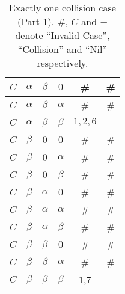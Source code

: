 \documentclass[fleqn]{article}
\begin{document}
\begin {table}
\begin{tabular}{|c|c|c|c|c|c|}
\hline
$C$ & $\alpha$ & $\beta$ & $0$ & \# & \# \\
\hline
$C$ & $\alpha$ & $\beta$ & $\alpha$ & \# & \# \\
\hline
$C$ & $\alpha$ & $\beta$ & $\beta$ & $1, 2, 6$ & - \\
\hline
$C$ & $\beta$ & $0$ & $0$ & \# & \# \\
\hline
$C$ & $\beta$ & $0$ & $\alpha$ & \# & \# \\
\hline
$C$ & $\beta$ & $0$ & $\beta$ & \# & \# \\
\hline
$C$ & $\beta$ & $\alpha$ & $0$ & \# & \# \\
\hline
$C$ & $\beta$ & $\alpha$ & $\alpha$ & \# & \# \\
\hline
$C$ & $\beta$ & $\alpha$ & $\beta$ & \# & \# \\
\hline
$C$ & $\beta$ & $\beta$ & $0$ & \# & \# \\
\hline
$C$ & $\beta$ & $\beta$ & $\alpha$ & \# & \# \\
\hline
$C$ & $\beta$ & $\beta$ & $\beta$ & $1$,$7$ & - \\
\hline
\end{tabular}
\caption{Exactly one collision case (Part 1). \#, $C$ and $-$ denote ``Invalid Case'', ``Collision'' and  ``Nil'' respectively.}
\label{Tab_OneC1}
\end{table}
\end{document}

